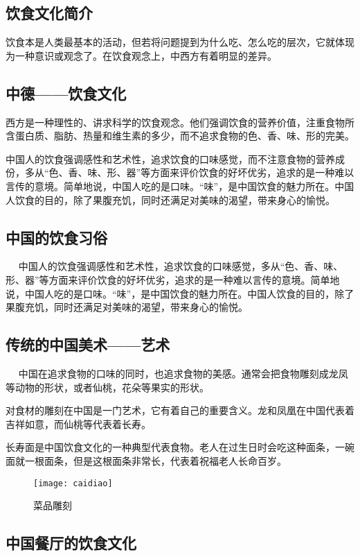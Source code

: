 \subsection{饮食文化简介}
    饮食本是人类最基本的活动，但若将问题提到为什么吃、怎么吃的层次，它就体现为一种意识或观念了。在饮食观念上，中西方有着明显的差异。

\subsection{中德——饮食文化}
    西方是一种理性的、讲求科学的饮食观念。他们强调饮食的营养价值，注重食物所含蛋白质、脂肪、热量和维生素的多少，而不追求食物的色、香、味、形的完美。 

    中国人的饮食强调感性和艺术性，追求饮食的口味感觉，而不注意食物的营养成份，多从“色、香、味、形、器”等方面来评价饮食的好坏优劣，追求的是一种难以言传的意境。简单地说，中国人吃的是口味。“味”，是中国饮食的魅力所在。中国人饮食的目的，除了果腹充饥，同时还满足对美味的渴望，带来身心的愉悦。

\subsection{中国的饮食习俗}
    中国人的饮食强调感性和艺术性，追求饮食的口味感觉，多从“色、香、味、形、器”等方面来评价饮食的好坏优劣，追求的是一种难以言传的意境。简单地说，中国人吃的是口味。“味”，是中国饮食的魅力所在。中国人饮食的目的，除了果腹充饥，同时还满足对美味的渴望，带来身心的愉悦。

\subsection{传统的中国美术——艺术}
    中国在追求食物的口味的同时，也追求食物的美感。通常会把食物雕刻成龙凤等动物的形状，或者仙桃，花朵等果实的形状。

    对食材的雕刻在中国是一门艺术，它有着自己的重要含义。龙和凤凰在中国代表着吉祥如意，而仙桃等代表着长寿。 

    长寿面是中国饮食文化的一种典型代表食物。老人在过生日时会吃这种面条，一碗面就一根面条，但是这根面条非常长，代表着祝福老人长命百岁。 

    \begin{figure}[htb]
        \centering
        \texttt{[image: caidiao]}
        \caption{菜品雕刻}
    \end{figure}

\subsection{中国餐厅的饮食文化}

